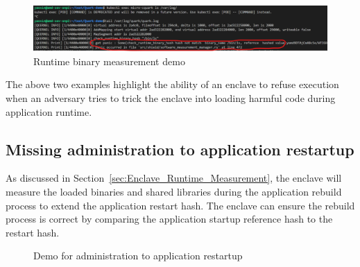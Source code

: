 \begin{figure}[!htb]
    \centering
    \includegraphics[width=1\textwidth]{images/cquark_runtime_runtime_binary_measurement_demo.png}
    \caption[Runtime binary measurement demo]{Runtime binary measurement demo}
    \label{fig:cquark_runtime_runtime_binary_measurement_demo}
\end{figure}



The above two examples highlight the ability of an enclave to refuse execution when an adversary tries to trick the enclave into loading harmful code during application runtime.

\subsection{Missing administration to application restartup}


As discussed in Section~\ref{sec:Enclave_Runtime_Measurement}, the enclave will measure the loaded binaries and shared libraries during the application rebuild process to extend the application restart hash. The enclave can ensure the rebuild process is correct by comparing the 
application startup reference hash to the restart hash.
\begin{figure}[!htb]


  
    \caption[Demo for  administration to application restartup]{Demo for  administration to application restartup}
\end{figure}



